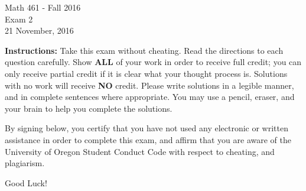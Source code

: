 \documentclass[addpoints]{exam}
\begin{document}
	\begin{coverpages}
		\begin{center}
			\Large{Math 461 - Fall 2016} \\
			\Large{Exam 2} \\
			\Large{21 November, 2016}
		\end{center}
		\vspace{0.1in}
		
		\begin{center}
			\vspace{0.1in}
		
			\vspace{0.1in}
		\end{center}
		
		\textbf{Instructions:} Take this exam without cheating. Read the directions to each question carefully. Show \textbf{ALL} of your work in order to receive full credit; you can only receive partial credit if it is clear what your thought process is. Solutions with no work will receive \textbf{NO} credit. Please write solutions in a legible manner, and in complete sentences where appropriate. You may use a pencil, eraser, and your brain to help you complete the solutions. 
		
		By signing below, you certify that you have not used any electronic or written assistance in order to complete this exam, and affirm that you are aware of the University of Oregon Student Conduct Code with respect to cheating, and plagiarism.
		
		Good Luck!
		
		\begin{center}
			\vspace{0.1in}
		\end{center}
	
		\begin{center}
			\gradetable[v][questions]
		\end{center}
		\vspace{0.5in}
	\end{coverpages}
	
\end{document}

